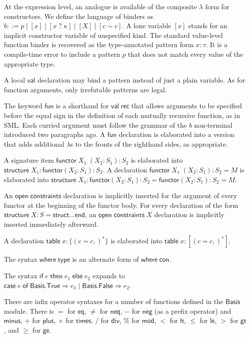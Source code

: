 \documentclass{article}
\newcommand{\mt}[1]{\mathsf{#1}}
\begin{document}
At the expression level, an analogue is available of the composite $\lambda$ form for constructors.  We define the language of binders as $b ::= p \mid [x] \mid [x \; ? \; \kappa] \mid [X] \mid [c \sim c]$.  A lone variable $[x]$ stands for an implicit constructor variable of unspecified kind.  The standard value-level function binder is recovered as the type-annotated pattern form $x : \tau$.  It is a compile-time error to include a pattern $p$ that does not match every value of the appropriate type.

A local $\mt{val}$ declaration may bind a pattern instead of just a plain variable.  As for function arguments, only irrefutable patterns are legal.

The keyword $\mt{fun}$ is a shorthand for $\mt{val} \; \mt{rec}$ that allows arguments to be specified before the equal sign in the definition of each mutually recursive function, as in SML.  Each curried argument must follow the grammar of the $b$ non-terminal introduced two paragraphs ago.  A $\mt{fun}$ declaration is elaborated into a version that adds additional $\lambda$s to the fronts of the righthand sides, as appropriate.

A signature item $\mt{functor} \; X_1 \; (X_2 : S_1) : S_2$ is elaborated into $\mt{structure} \; X_1 : \mt{functor}(X_2 : S_1) : S_2$.  A declaration $\mt{functor} \; X_1 \; (X_2 : S_1) : S_2 = M$ is elaborated into $\mt{structure} \; X_1 : \mt{functor}(X_2 : S_1) : S_2 = \mt{functor}(X_2 : S_1) : S_2 = M$.

An $\mt{open} \; \mt{constraints}$ declaration is implicitly inserted for the argument of every functor at the beginning of the functor body.  For every declaration of the form $\mt{structure} \; X : S = \mt{struct} \ldots \mt{end}$, an $\mt{open} \; \mt{constraints} \; X$ declaration is implicitly inserted immediately afterward.

A declaration $\mt{table} \; x : \{(c = c,)^*\}$ is elaborated into $\mt{table} \; x : [(c = c,)^*]$.

The syntax $\mt{where} \; \mt{type}$ is an alternate form of $\mt{where} \; \mt{con}$.

The syntax $\mt{if} \; e \; \mt{then} \; e_1 \; \mt{else} \; e_2$ expands to $\mt{case} \; e \; \mt{of} \; \mt{Basis}.\mt{True} \Rightarrow e_1 \mid \mt{Basis}.\mt{False} \Rightarrow e_2$.

There are infix operator syntaxes for a number of functions defined in the $\mt{Basis}$ module.  There is $=$ for $\mt{eq}$, $\neq$ for $\mt{neq}$, $-$ for $\mt{neg}$ (as a prefix operator) and $\mt{minus}$, $+$ for $\mt{plus}$, $\times$ for $\mt{times}$, $/$ for $\mt{div}$, $\%$ for $\mt{mod}$, $<$ for $\mt{lt}$, $\leq$ for $\mt{le}$, $>$ for $\mt{gt}$, and $\geq$ for $\mt{ge}$.
\end{document}
